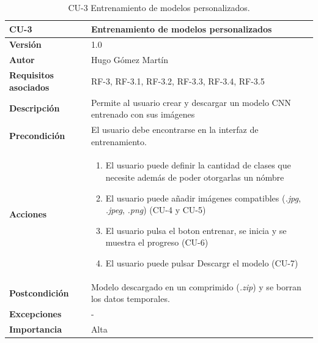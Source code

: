 \begin{table}[p]
	\centering
	\begin{tabularx}{\linewidth}{ p{} p{} }
		\toprule
		\textbf{CU-3}    & \textbf{Entrenamiento de modelos personalizados}\\
		\toprule
		\textbf{Versión}              & 1.0    \\
		\textbf{Autor}                & Hugo Gómez Martín \\
		\textbf{Requisitos asociados} & RF-3, RF-3.1, RF-3.2, RF-3.3, RF-3.4, RF-3.5 \\
		\textbf{Descripción}          & Permite al usuario crear y descargar un modelo CNN entrenado con sus imágenes \\
		\textbf{Precondición}         &  El usuario debe encontrarse en la interfaz de entrenamiento.\\
		\textbf{Acciones}             &
		\begin{enumerate}
			\def\labelenumi{\arabic{enumi}.}
			\tightlist
			\item El usuario puede definir la cantidad de clases que necesite además de poder otorgarlas un nómbre
			\item El usuario puede añadir imágenes compatibles (\textit{.jpg}, \textit{.jpeg}, \textit{.png}) (CU-4 y CU-5)
                \item El usuario pulsa el boton entrenar, se inicia y se muestra el progreso (CU-6)
                \item El usuario puede pulsar Descargr el modelo (CU-7)
		\end{enumerate}\\
		\textbf{Postcondición}        & Modelo descargado en un comprimido (\textit{.zip}) y se borran los datos temporales.\\
		\textbf{Excepciones}          & - \\
		\textbf{Importancia}          & Alta \\
		\bottomrule
	\end{tabularx}
	\caption{CU-3 Entrenamiento de modelos personalizados.}
\end{table}

